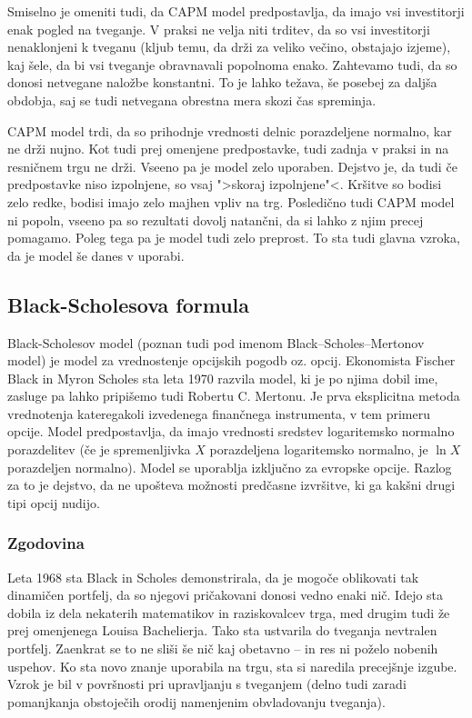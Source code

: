 \documentclass[12pt,a4paper]{amsart}
\theoremstyle{definition} %
\theoremstyle{plain} %
\begin{document}
Smiselno je omeniti tudi, da CAPM model predpostavlja, da imajo vsi investitorji enak pogled na 
tveganje. V praksi ne velja niti trditev, da so vsi investitorji nenaklonjeni k tveganu (kljub temu,
da drži za veliko večino, obstajajo izjeme), kaj šele, da bi vsi tveganje obravnavali popolnoma 
enako. Zahtevamo tudi, da so donosi netvegane naložbe konstantni. To je lahko težava, še 
posebej za daljša obdobja, saj se tudi netvegana obrestna mera skozi čas spreminja. 

CAPM model trdi, da so prihodnje vrednosti delnic porazdeljene normalno, kar ne drži nujno.
Kot tudi prej omenjene predpostavke, tudi zadnja v praksi in na resničnem trgu ne drži. Vseeno
pa je model zelo uporaben. Dejstvo je, da tudi če predpostavke niso izpolnjene, so vsaj 
">skoraj izpolnjene"<. Kršitve so bodisi zelo redke, bodisi imajo zelo majhen vpliv na trg. 
Posledično tudi CAPM model ni popoln, vseeno pa so rezultati dovolj natančni, da si lahko 
z njim precej pomagamo. Poleg tega pa je model tudi zelo preprost. To sta tudi glavna vzroka,
da je model še danes v uporabi.


\subsection{Black-Scholesova formula}
Black-Scholesov model (poznan tudi pod imenom Black–Scholes–Mertonov model) je model za 
vrednostenje opcijskih pogodb oz. opcij. Ekonomista Fischer Black in Myron Scholes sta leta 
1970 razvila model, ki je po njima dobil ime, zasluge pa lahko pripišemo tudi Robertu C. Mertonu.
Je prva eksplicitna metoda vrednotenja kateregakoli izvedenega 
finančnega instrumenta, v tem primeru opcije. Model predpostavlja, da imajo vrednosti sredstev logaritemsko 
normalno porazdelitev (če je spremenljivka $X$ porazdeljena logaritemsko normalno, je 
$\ln X$ porazdeljen normalno). Model se uporablja izključno za evropske opcije. Razlog za 
to je dejstvo, da ne upošteva možnosti predčasne izvršitve, ki ga kakšni drugi tipi opcij nudijo. 

\subsubsection{Zgodovina}
Leta 1968 sta Black in Scholes demonstrirala, da je mogoče oblikovati tak dinamičen portfelj,
da so njegovi pričakovani donosi vedno enaki nič. Idejo sta dobila iz dela nekaterih matematikov in 
raziskovalcev trga, med drugim tudi že prej omenjenega Louisa Bachelierja. Tako sta ustvarila 
do tveganja nevtralen portfelj. Zaenkrat se to ne sliši še nič kaj obetavno -- in res ni poželo
nobenih uspehov. Ko sta novo znanje uporabila na trgu, sta si naredila precejšnje izgube.
Vzrok je bil v površnosti pri upravljanju s tveganjem (delno tudi zaradi pomanjkanja obstoječih
orodij namenjenim obvladovanju tveganja). 
\end{document}
